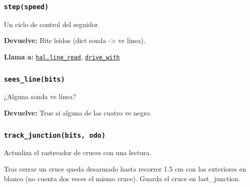 \subsubsection{\texttt{step(speed)}}\label{fn:linefollow:step}
\noindent Un ciclo de control del seguidor.

\par{}\par\smallskip
\noindent\textbf{Devuelve:} Bits leídos (dict sonda -> ve línea).\par
\noindent\textbf{Llama a:} \hyperref[fn:hal:line-read]{\texttt{hal.line\_\allowbreak{}read}}, \hyperref[fn:linefollow:drive-with]{\texttt{drive\_\allowbreak{}with}}\par

\subsubsection{\texttt{sees\_\allowbreak{}line(bits)}}\label{fn:linefollow:sees-line}
\noindent ¿Alguna sonda ve línea?

\par{}\par\smallskip
\noindent\textbf{Devuelve:} True si alguna de las cuatro ve negro.\par

\subsubsection{\texttt{track\_\allowbreak{}junction(bits, odo)}}\label{fn:linefollow:track-junction}
\noindent Actualiza el rastreador de cruces con una lectura.

Tras cerrar un cruce queda desarmado hasta recorrer 1.5 cm con las exteriores en blanco (no cuenta dos veces el mismo cruce). Guarda el cruce en last\_junction.

